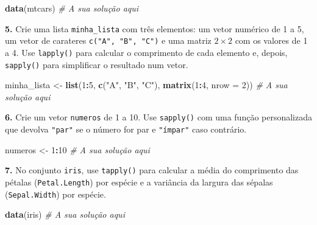 \documentclass[
  portuguese,
  11pt,
  openany]{book}
\newenvironment{Shaded}{\begin{snugshade}}{\end{snugshade}}
\newcommand{\AttributeTok}[1]{\textcolor[rgb]{0.13,0.29,0.53}{#1}}
\newcommand{\CommentTok}[1]{\textcolor[rgb]{0.56,0.35,0.01}{\textit{#1}}}
\newcommand{\DecValTok}[1]{\textcolor[rgb]{0.00,0.00,0.81}{#1}}
\newcommand{\FunctionTok}[1]{\textcolor[rgb]{0.13,0.29,0.53}{\textbf{#1}}}
\newcommand{\NormalTok}[1]{#1}
\newcommand{\OtherTok}[1]{\textcolor[rgb]{0.56,0.35,0.01}{#1}}
\newcommand{\SpecialCharTok}[1]{\textcolor[rgb]{0.81,0.36,0.00}{\textbf{#1}}}
\newcommand{\StringTok}[1]{\textcolor[rgb]{0.31,0.60,0.02}{#1}}
\begin{document}
\begin{Shaded}
\begin{Highlighting}[]
\FunctionTok{data}\NormalTok{(mtcars)}
\CommentTok{\# A sua solução aqui}
\end{Highlighting}
\end{Shaded}

\textbf{5.} Crie uma lista \texttt{minha\_lista} com três elementos: um vetor numérico de 1 a 5, um
vetor de carateres \texttt{c("A",\ "B",\ "C")} e uma matriz \(2 \times 2\) com os valores de 1 a
4. Use \texttt{lapply()} para calcular o comprimento de cada elemento e, depois, \texttt{sapply()}
para simplificar o resultado num vetor.

\begin{Shaded}
\begin{Highlighting}[]
\NormalTok{minha\_lista }\OtherTok{\textless{}{-}} \FunctionTok{list}\NormalTok{(}\DecValTok{1}\SpecialCharTok{:}\DecValTok{5}\NormalTok{, }\FunctionTok{c}\NormalTok{(}\StringTok{"A"}\NormalTok{, }\StringTok{"B"}\NormalTok{, }\StringTok{"C"}\NormalTok{), }\FunctionTok{matrix}\NormalTok{(}\DecValTok{1}\SpecialCharTok{:}\DecValTok{4}\NormalTok{, }\AttributeTok{nrow =} \DecValTok{2}\NormalTok{))}
\CommentTok{\# A sua solução aqui}
\end{Highlighting}
\end{Shaded}

\textbf{6.} Crie um vetor \texttt{numeros} de 1 a 10. Use \texttt{sapply()} com uma função personalizada
que devolva \texttt{"par"} se o número for par e \texttt{"ímpar"} caso contrário.

\begin{Shaded}
\begin{Highlighting}[]
\NormalTok{numeros }\OtherTok{\textless{}{-}} \DecValTok{1}\SpecialCharTok{:}\DecValTok{10}
\CommentTok{\# A sua solução aqui}
\end{Highlighting}
\end{Shaded}

\textbf{7.} No conjunto \texttt{iris}, use \texttt{tapply()} para calcular a média do comprimento das
pétalas (\texttt{Petal.Length}) por espécie e a variância da largura das sépalas
(\texttt{Sepal.Width}) por espécie.

\begin{Shaded}
\begin{Highlighting}[]
\FunctionTok{data}\NormalTok{(iris)}
\CommentTok{\# A sua solução aqui}
\end{Highlighting}
\end{Shaded}
\end{document}
